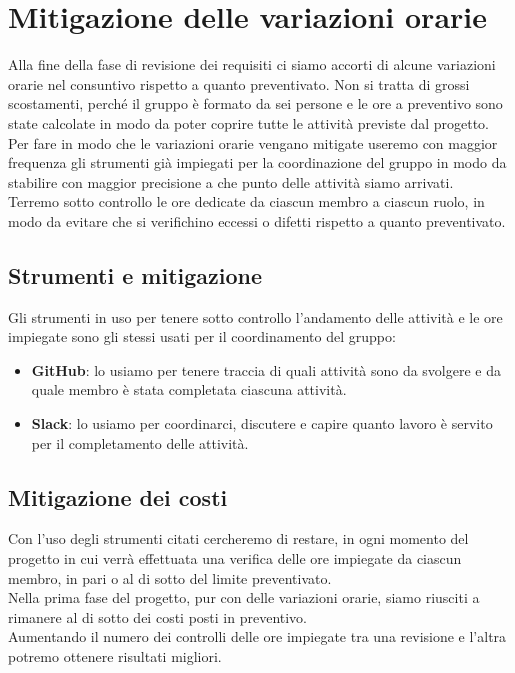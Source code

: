 \newpage

\section{Mitigazione delle variazioni orarie}	\label{mitigazione variazioni}
Alla fine della fase di revisione dei requisiti ci siamo accorti di alcune variazioni orarie nel consuntivo rispetto a quanto preventivato.
Non si tratta di grossi scostamenti, perché il gruppo è formato da sei persone e le ore a preventivo sono state calcolate in modo da poter coprire tutte le attività previste dal progetto.\\
Per fare in modo che le variazioni orarie vengano mitigate useremo con maggior frequenza gli strumenti già impiegati per la coordinazione del gruppo in modo da stabilire con maggior precisione a che punto delle attività siamo arrivati.\\
Terremo sotto controllo le ore dedicate da ciascun membro a ciascun ruolo, in modo da evitare che si verifichino eccessi o difetti rispetto a quanto preventivato.

    \subsection{Strumenti e mitigazione}
	Gli strumenti in uso per tenere sotto controllo l'andamento delle attività e le ore impiegate sono gli stessi usati per il coordinamento del gruppo:
	\begin{itemize}
	    \item \textbf{GitHub}: lo usiamo per tenere traccia di quali attività sono da svolgere e da quale membro è stata completata ciascuna attività.
	    \item \textbf{Slack}: lo usiamo per coordinarci, discutere e capire quanto lavoro è servito per il completamento delle attività.
	\end{itemize}
	
	\subsection{Mitigazione dei costi}
	Con l'uso degli strumenti citati cercheremo di restare, in ogni momento del progetto in cui verrà effettuata una verifica delle ore impiegate da ciascun membro, in pari o al di sotto del limite preventivato.\\
	Nella prima fase del progetto, pur con delle variazioni orarie, siamo riusciti a rimanere al di sotto dei costi posti in preventivo.\\
	Aumentando il numero dei controlli delle ore impiegate tra una revisione e l'altra potremo ottenere risultati migliori.

